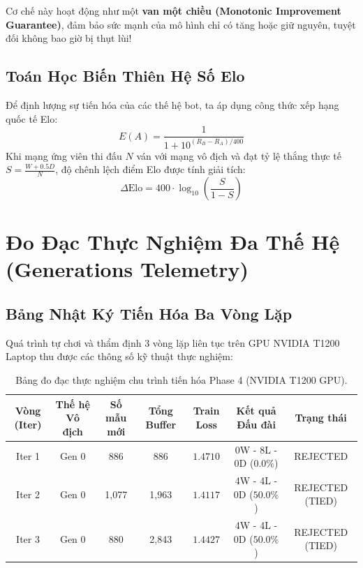 \documentclass[12pt,a4paper,oneside]{report}
\begin{document}
Cơ chế này hoạt động như một \textbf{van một chiều (Monotonic Improvement Guarantee)}, đảm bảo sức mạnh của mô hình chỉ có tăng hoặc giữ nguyên, tuyệt đối không bao giờ bị thụt lùi!

\section{Toán Học Biến Thiên Hệ Số Elo}

Để định lượng sự tiến hóa của các thế hệ bot, ta áp dụng công thức xếp hạng quốc tế Elo:
\begin{equation}
    E(A) = \frac{1}{1 + 10^{(R_B - R_A)/400}}
\end{equation}
Khi mạng ứng viên thi đấu $N$ ván với mạng vô địch và đạt tỷ lệ thắng thực tế $S = \frac{W + 0.5 D}{N}$, độ chênh lệch điểm Elo được tính giải tích:
\begin{equation}
    \Delta \text{Elo} = 400 \cdot \log_{10} \left( \frac{S}{1 - S} \right)
\end{equation}

\chapter{Đo Đạc Thực Nghiệm Đa Thế Hệ (Generations Telemetry)}

\section{Bảng Nhật Ký Tiến Hóa Ba Vòng Lặp}

Quá trình tự chơi và thẩm định 3 vòng lặp liên tục trên GPU NVIDIA T1200 Laptop thu được các thông số kỹ thuật thực nghiệm:

\begin{table}[htbp]
\centering
\caption{Bảng đo đạc thực nghiệm chu trình tiến hóa Phase 4 (NVIDIA T1200 GPU).}
\label{tab:rl_iteration_results}
\begin{tabular}{ccccccc}
\toprule
\textbf{Vòng (Iter)} & \textbf{Thế hệ Vô địch} & \textbf{Số mẫu mới} & \textbf{Tổng Buffer} & \textbf{Train Loss} & \textbf{Kết quả Đấu đài} & \textbf{Trạng thái}\\
\midrule
Iter 1 & Gen 0 & 886 & 886 & $1.4710$ & 0W - 8L - 0D ($0.0\%$) & REJECTED\\
Iter 2 & Gen 0 & 1,077 & 1,963 & $1.4117$ & 4W - 4L - 0D ($50.0\%$) & REJECTED (TIED)\\
Iter 3 & Gen 0 & 880 & 2,843 & $1.4427$ & 4W - 4L - 0D ($50.0\%$) & REJECTED (TIED)\\
\bottomrule
\end{tabular}
\end{table}
\end{document}
